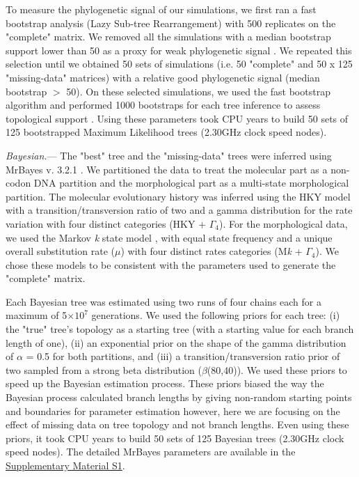 \documentclass[12pt,letterpaper]{article}
\renewcommand{\subsubsection}[1]{%
\vspace{2ex}
\noindent
\textit{#1.}---}
\begin{document}
To measure the phylogenetic signal of our simulations, we first ran a fast bootstrap analysis (Lazy Sub-tree Rearrangement) with 500 replicates on the "complete" matrix. We removed all the simulations with a median bootstrap support lower than 50 as a proxy for weak phylogenetic signal \citep{zanderminimal2004}. We repeated this selection until we obtained 50 sets of simulations (i.e. 50 "complete" and 50 x 125 "missing-data" matrices) with a relative good phylogenetic signal (median bootstrap $>$ 50). On these selected simulations, we used the fast bootstrap algorithm and performed 1000 bootstraps for each tree inference to assess topological support \citep{pattengale2010many}. Using these parameters took  CPU years to build 50 sets of 125 bootstrapped Maximum Likelihood trees (2.30GHz clock speed nodes).

\subsubsection{Bayesian}
The "best" tree and the "missing-data" trees were inferred using MrBayes v. 3.2.1 \citep{Ronquist2012mrbayes}. We partitioned the data to treat the molecular part as a non-codon DNA partition and the morphological part as a multi-state morphological partition. The molecular evolutionary history was inferred using the HKY model with a transition/transversion ratio of two \citep{douadycomparison2003} and a gamma distribution for the rate variation with four distinct categories (HKY + $\Gamma_4$). For the morphological data, we used the Markov \textit{k} state model \citep{lewisa2001}, with equal state frequency and a unique overall substitution rate ($\mu$) with four distinct rates categories (M\textit{k} + $\Gamma_4$). We chose these models to be consistent with the parameters used to generate the "complete" matrix.

Each Bayesian tree was estimated using two runs of four chains each for a maximum of 5$\times$$10^7$ generations. We used the following priors for each tree: (i) the "true" tree’s topology as a starting tree (with a starting value for each branch length of one), (ii) an exponential prior on the shape of the gamma distribution of $\alpha$ = 0.5 for both partitions, and (iii) a transition/transversion ratio prior of two sampled from a strong beta distribution ($\beta$(80,40)). We used these priors to speed up the Bayesian estimation process. These priors biased the way the Bayesian process calculated branch lengths by giving non-random starting points and boundaries for parameter estimation however, here we are focusing on the effect of missing data on tree topology and not branch lengths. Even using these priors, it took  CPU years to build 50 sets of 125 Bayesian trees (2.30GHz clock speed nodes). The detailed MrBayes parameters are available in the \hyperref[SupplementaryMaterial]{Supplementary Material S1}.
\end{document}
